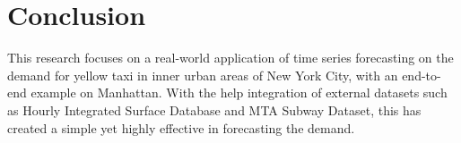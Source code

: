 \documentclass[11pt]{article}
\begin{document}
            
    






            
    
    


\section{Conclusion}
This research focuses on a real-world application of time series forecasting on the demand for yellow taxi in inner urban areas of New York City, with an end-to-end example on Manhattan. With the help integration of external datasets such as Hourly Integrated Surface Database and MTA Subway Dataset, this has created a simple yet highly effective in forecasting the demand.
\end{document}
